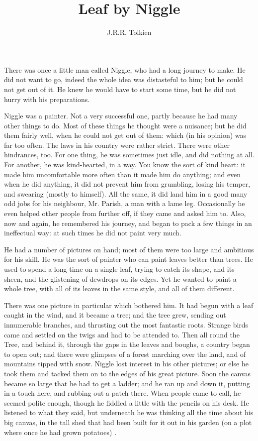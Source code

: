 \documentclass[english]{scrartcl}
\begin{document}
\title{Leaf by Niggle}
\author{J.R.R. Tolkien}
\date{\gitFirstTagDescribe}
\maketitle

There was once a little man called Niggle, who had a long journey to make. He did not want to go, indeed the whole idea was distasteful to him; but he could not get out of it. He knew he would have to start some time, but he did not hurry with his preparations.

Niggle was a painter. Not a very successful one, partly because he had many other things to do. Most of these things he thought were a nuisance; but he did them fairly well, when he could not get out of them: which (in his opinion) was far too often. The laws in his country were rather strict. There were other hindrances, too. For one thing, he was sometimes just idle, and did nothing at all. For another, he was kind-hearted, in a way. You know the sort of kind heart: it made him uncomfortable more often than it made him do anything; and even when he did anything, it did not prevent him from grumbling, losing his temper, and swearing (mostly to himself). All the same, it did land him in a good many odd jobs for his neighbour, Mr. Parish, a man with a lame leg. Occasionally he even helped other people from further off, if they came and asked him to. Also, now and again, he remembered his journey, and began to pack a few things in an ineffectual way: at such times he did not paint very much.

He had a number of pictures on hand; most of them were too large and ambitious for his skill. He was the sort of painter who can paint leaves better than trees. He used to spend a long time on a single leaf, trying to catch its shape, and its sheen, and the glistening of dewdrops on its edges. Yet he wanted to paint a whole tree, with all of its leaves in the same style, and all of them different.

There was one picture in particular which bothered him. It had begun with a leaf caught in the wind, and it became a tree; and the tree grew, sending out innumerable branches, and thrusting out the most fantastic roots. Strange birds came and settled on the twigs and had to be attended to. Then all round the Tree, and behind it, through the gaps in the leaves and boughs, a country began to open out; and there were glimpses of a forest marching over the land, and of mountains tipped with snow. Niggle lost interest in his other pictures; or else he took them and tacked them on to the edges of his great picture. Soon the canvas became so large that he had to get a ladder; and he ran up and down it, putting in a touch here, and rubbing out a patch there. When people came to call, he seemed polite enough, though he fiddled a little with the pencils on his desk. He listened to what they said, but underneath he was thinking all the time about his big canvas, in the tall shed that had been built for it out in his garden (on a plot where once he had grown potatoes) .
\end{document}
